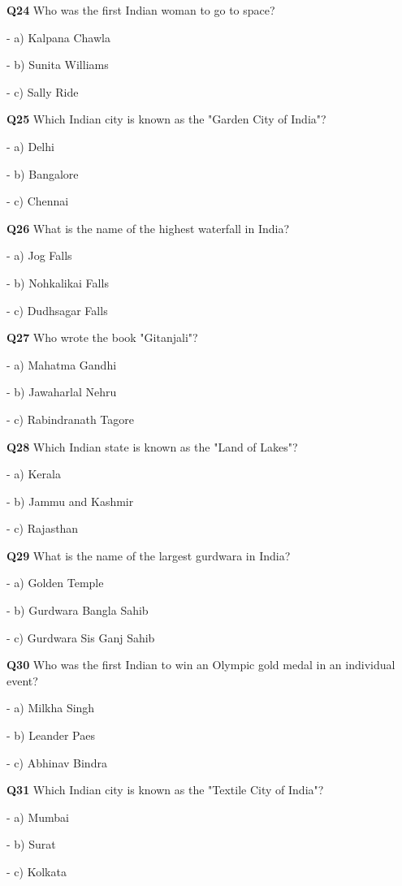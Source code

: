 \textbf{Q24} Who was the first Indian woman to go to space?\par
\quad - a) Kalpana Chawla\par
\quad - b) Sunita Williams\par
\quad - c) Sally Ride\par

\textbf{Q25} Which Indian city is known as the "Garden City of India"?\par
\quad - a) Delhi\par
\quad - b) Bangalore\par
\quad - c) Chennai\par

\textbf{Q26} What is the name of the highest waterfall in India?\par
\quad - a) Jog Falls\par
\quad - b) Nohkalikai Falls\par
\quad - c) Dudhsagar Falls\par

\textbf{Q27} Who wrote the book "Gitanjali"?\par
\quad - a) Mahatma Gandhi\par
\quad - b) Jawaharlal Nehru\par
\quad - c) Rabindranath Tagore\par

\textbf{Q28} Which Indian state is known as the "Land of Lakes"?\par
\quad - a) Kerala\par
\quad - b) Jammu and Kashmir\par
\quad - c) Rajasthan\par

\textbf{Q29} What is the name of the largest gurdwara in India?\par
\quad - a) Golden Temple\par
\quad - b) Gurdwara Bangla Sahib\par
\quad - c) Gurdwara Sis Ganj Sahib\par

\textbf{Q30} Who was the first Indian to win an Olympic gold medal in an individual event?\par
\quad - a) Milkha Singh\par
\quad - b) Leander Paes\par
\quad - c) Abhinav Bindra\par

\textbf{Q31} Which Indian city is known as the "Textile City of India"?\par
\quad - a) Mumbai\par
\quad - b) Surat\par
\quad - c) Kolkata\par


